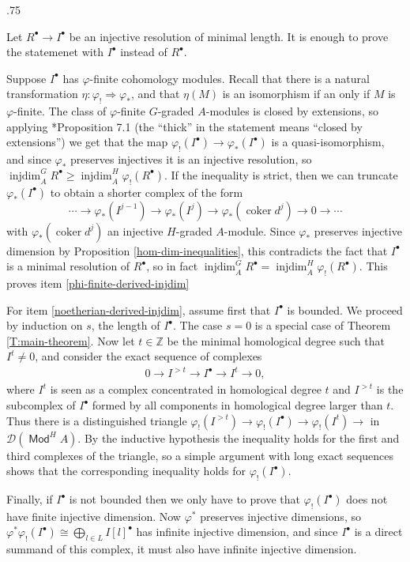 \documentclass[11pt,fleqn]{article}
\makeatletter
\renewenvironment{proof}[1][\textit{Proof}]{\par
  \pushQED{\qed}%
  \normalfont \topsep.75\paraskip\relax
  \trivlist
  \item[\hskip\labelsep
        \itshape
    #1\@addpunct{.}]\ignorespaces
}{%
  \popQED\endtrivlist\@endpefalse
}
\newcommand\ZZ{\mathbb Z}
\renewcommand\to{\longrightarrow}
\renewcommand\phi{\varphi}
\newcommand\D{\mathcal D}
\DeclareMathOperator\Mod{\mathsf{Mod}}
\DeclareMathOperator\injdim{injdim}
\DeclareMathOperator\coker{coker}
\makeatother
\begin{document}
\begin{proof}
Let $R^\bullet \to I^\bullet$ be an injective resolution of minimal length.
It is enough to prove the statemenet with $I^\bullet$ instead of $R^\bullet$.

Suppose $I^\bullet$ has $\phi$-finite cohomology modules. Recall that there is 
a natural transformation $\eta: \phi_! \Rightarrow \phi_*$, and that $\eta(M)$ 
is an isomorphism if an only if $M$ is $\phi$-finite. The class of 
$\phi$-finite $G$-graded $A$-modules is closed by extensions, so applying 
\cite{Hart-RD}*{Proposition 7.1} (the ``thick'' in the statement means 
``closed by extensions'') we get that the map $\phi_!(I^\bullet) \to 
\phi_*(I^\bullet)$ is a quasi-isomorphism, and since $\phi_*$ preserves 
injectives it is an injective resolution, so $\injdim_A^{G} R^\bullet \geq 
\injdim_A^H \phi_!(R^\bullet)$. If the inequality is strict, then we can 
truncate $\phi_*(I^\bullet)$ to obtain a shorter complex of the form
\[
\cdots 
  \to \phi_*(I^{j-1}) 
  \to \phi_*(I^{j}) 
  \to \phi_*(\coker d^j) 
  \to 0 
  \to \cdots
\]
with $\phi_*(\coker d^j)$ an injective $H$-graded $A$-module. Since $\phi_*$
preserves injective dimension by Proposition \ref{hom-dim-inequalities}, this
contradicts the fact that $I^\bullet$ is a minimal resolution of $R^\bullet$,
so in fact $\injdim_A^{G} R^\bullet = \injdim_A^H \phi_!(R^\bullet)$. This
proves item \ref{phi-finite-derived-injdim}

For item \ref{noetherian-derived-injdim}, assume first that $I^\bullet$ is 
bounded. We proceed by induction on $s$, the length of $I^\bullet$. The case 
$s = 0$ is a special case of Theorem \ref{T:main-theorem}. Now let $t \in \ZZ$ 
be the minimal homological degree such that $I^t \neq 0$, and consider the 
exact sequence of complexes
\begin{align*}
0 \to I^{> t} \to I^\bullet \to I^t \to 0,
\end{align*}
where $I^t$ is seen as a complex concentrated in homological degree $t$ and
$I^{> t}$ is the subcomplex of $I^\bullet$ formed by all components in 
homological degree larger than $t$. Thus there is a distinguished triangle
$\phi_!(I^{> t}) \to \phi_!(I^\bullet) \to \phi_!(I^t) \to$ in $\D(\Mod^H A)$.
By the inductive hypothesis the inequality holds for the first and third 
complexes of the triangle, so a simple argument with long exact sequences 
shows that the corresponding inequality holds for $\phi_!(I^\bullet)$.

Finally, if $I^\bullet$ is not bounded then we only have to prove that 
$\phi_!(I^\bullet)$ does not have finite injective dimension. Now $\phi^*$
preserves injective dimensions, so $\phi^*\phi_!(I^\bullet) \cong 
\bigoplus_{l \in L} I[l]^\bullet$ has infinite injective dimension, and since
$I^\bullet$ is a direct summand of this complex, it must also have infinite
injective dimension.
\end{proof}
\end{document}
